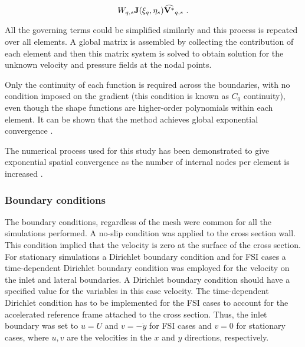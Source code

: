  \begin{equation} \centering
 W_{q,s}\jacobian(\compone_{q},\comptwo_{s})\widehat{\Vint}_{q,s} ~.
 \end{equation}
 
 
 All the governing terms could be simplified similarly and this process is repeated over all elements. A global matrix is assembled by collecting the contribution of each element and then this matrix system is solved to obtain solution for the unknown velocity and pressure fields at the nodal points. 
 
 Only the continuity of each function is required across the boundaries, with no condition imposed on the gradient (this condition
 is known as $C_{0}$ continuity), even though the shape functions are higher-order polynomials within each element. It can be shown that the method achieves global exponential convergence \citep{karniadakis2005}.  
 
 The numerical process used for this study has been demonstrated to give
 exponential spatial convergence as the number of internal nodes per
 element is increased \citep{Thompson1996a}.
 
 
 
 
 
 
 
 
 
 
 
 







   







\subsubsection{Boundary conditions}

The boundary conditions, regardless of the mesh  were common for all the simulations performed. A no-slip condition was applied to the cross section wall. This condition implied that the velocity is zero at the surface of the cross section. For stationary simulations a Dirichlet boundary condition and for FSI cases a time-dependent Dirichlet boundary condition was employed for the velocity on the inlet and lateral boundaries. A Dirichlet boundary condition should have a specified value for the variables \citep{kreyszig2010} in this case velocity. The time-dependent Dirichlet condition has to be implemented for the FSI cases to account for the accelerated reference frame attached to the cross section. Thus, the inlet boundary was set to $u=U$ and $v=-\dot{y}$ for FSI cases and $v=0$ for stationary cases, where $u,v$ are the velocities in the $x$ and $y$ directions, respectively.

